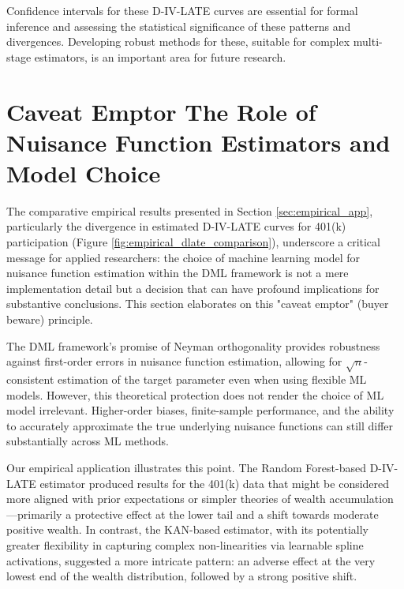\documentclass[final,3p,fleqn, 10pt]{elsarticle}
\begin{document}
Confidence intervals for these D-IV-LATE curves are essential for formal inference and assessing the statistical significance of these patterns and divergences. Developing robust methods for these, suitable for complex multi-stage estimators, is an important area for future research.

\section{Caveat Emptor The Role of Nuisance Function Estimators and Model Choice}
\label{sec:caveat_emptor}

The comparative empirical results presented in Section \ref{sec:empirical_app}, particularly the divergence in estimated D-IV-LATE curves for 401(k) participation (Figure \ref{fig:empirical_dlate_comparison}), underscore a critical message for applied researchers: the choice of machine learning model for nuisance function estimation within the DML framework is not a mere implementation detail but a decision that can have profound implications for substantive conclusions. This section elaborates on this "caveat emptor" (buyer beware) principle.

The DML framework's promise of Neyman orthogonality provides robustness against first-order errors in nuisance function estimation, allowing for $\sqrt{n}$-consistent estimation of the target parameter even when using flexible ML models. However, this theoretical protection does not render the choice of ML model irrelevant. Higher-order biases, finite-sample performance, and the ability to accurately approximate the true underlying nuisance functions can still differ substantially across ML methods.

Our empirical application illustrates this point. The Random Forest-based D-IV-LATE estimator produced results for the 401(k) data that might be considered more aligned with prior expectations or simpler theories of wealth accumulation—primarily a protective effect at the lower tail and a shift towards moderate positive wealth. In contrast, the KAN-based estimator, with its potentially greater flexibility in capturing complex non-linearities via learnable spline activations, suggested a more intricate pattern: an adverse effect at the very lowest end of the wealth distribution, followed by a strong positive shift.
\end{document}
